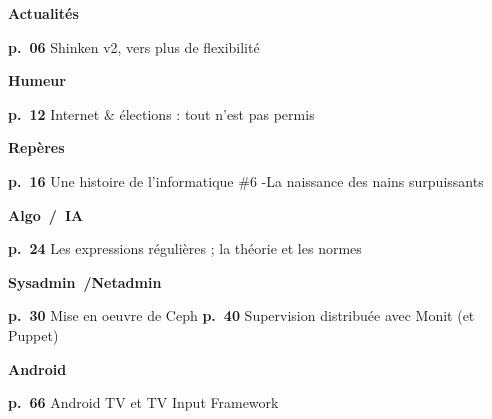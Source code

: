 
\large{\textbf{\color{darkgray}Actualités}}

\normalsize{}\color{black}
\begin{changemargin}{0.4cm}{0.2cm}
\textbf{p.~06} Shinken v2, vers plus de flexibilité
\end{changemargin}
\vspace*{0.2cm}

\large{\textbf{\color{darkgray}Humeur}}

\normalsize{}\color{black}
\begin{changemargin}{0.4cm}{0.2cm}
\textbf{p.~12} Internet \& élections : tout n’est pas permis
\end{changemargin}
\vspace*{0.2cm}

\large{\textbf{\color{darkgray}Repères}}

\normalsize{}\color{black}
\begin{changemargin}{0.4cm}{0.2cm}
\textbf{p.~16} Une histoire de l'informatique \#6 -La naissance des nains surpuissants
\end{changemargin}
\vspace*{0.2cm}

\large{\textbf{\color{darkgray}Algo~/~IA}}

\normalsize{}\color{black}
\begin{changemargin}{0.4cm}{0.2cm}
\textbf{p.~24} Les expressions régulières ; la théorie et les normes
\end{changemargin}
\vspace*{0.2cm}

\large{\textbf{\color{darkgray}Sysadmin~/Netadmin}}

\normalsize{}\color{black}
\begin{changemargin}{0.4cm}{0.2cm}
\textbf{p.~30} Mise en oeuvre de Ceph
\textbf{p.~40} Supervision distribuée avec Monit (et Puppet)
    \end{changemargin}
    \vspace*{0.2cm}

    \large{\textbf{\color{darkgray}Android}}

    \normalsize{}\color{black}
    \begin{changemargin}{0.4cm}{0.2cm}
    \textbf{p.~66} Android TV et TV Input Framework
    \end{changemargin}
    \vspace*{0.2cm}
